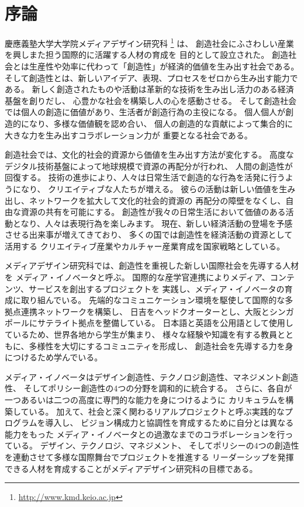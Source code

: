 
\chapter{序論}
\label{intro}

\makeendnotes

慶應義塾大学大学院メディアデザイン研究科%
\footnote{\url{http://www.kmd.keio.ac.jp}} は、
創造社会にふさわしい産業を興しまた担う国際的に活躍する人材の育成を%
目的として設立された。
創造社会とは生産性や効率に代わって「創造性」が経済的価値を生み出す社会である。
そして創造性とは、新しいアイデア、表現、プロセスをゼロから生み出す能力である。
新しく創造されたものや活動は革新的な技術を生み出し活力のある経済基盤を創りだし、
心豊かな社会を構築し人の心を感動させる。
そして創造社会では個人の創造に価値があり、生活者が創造行為の主役になる。
個人個人が創造的になり、多様な価値観を認め合い、
個人の創造的な貢献によって集合的に大きな力を生み出すコラボレーション力が%
重要となる社会である。

創造社会では、文化的社会的資源から価値を生み出す方法が変化する。
高度なデジタル技術基盤によって地球規模で資源の再配分が行われ、
人間の創造性が回復する。
技術の進歩により、人々は日常生活で創造的な行為を活発に行うようになり、
クリエイティブな人たちが増える。
彼らの活動は新しい価値を生み出し、ネットワークを拡大して文化的社会的資源の%
再配分の障壁をなくし、自由な資源の共有を可能にする。
創造性が我々の日常生活において価値のある活動となり、人々は表現行為を楽しみます。
現在、新しい経済活動の登場を予感させる出来事が増えてきており、
多くの国では創造性を経済活動の資源として活用する%
クリエイティブ産業やカルチャー産業育成を国家戦略としている。

メディアデザイン研究科では、創造性を重視した新しい国際社会を先導する人材を%
メディア・イノベータと呼ぶ。
国際的な産学官連携によりメディア、コンテンツ、サービスを創出するプロジェクトを%
実践し、メディア・イノベータの育成に取り組んでいる。
先端的なコミュニケーション環境を駆使して国際的な多拠点連携ネットワークを構築し、
日吉をヘッドクオーターとし、大阪とシンガポールにサテライト拠点を整備している。
日本語と英語を公用語として使用しているため、世界各地から学生が集まり、
様々な経験や知識を有する教員とともに、多様性を大切にするコミュニティを形成し、
創造社会を先導する力を身につけるため学んでいる。

メディア・イノベータはデザイン創造性、テクノロジ創造性、マネジメント創造性、
そしてポリシー創造性の4つの分野を調和的に統合する。
さらに、各自が一つあるいは二つの高度に専門的な能力を身につけるように%
カリキュラムを構築している。
加えて、社会と深く関わるリアルプロジェクトと呼ぶ実践的なプログラムを導入し、
ビジョン構成力と協調性を育成するために自分とは異なる能力をもった%
メディア・イノベータとの過激なまでのコラボレーションを行っている。
デザイン、テクノロジ、マネジメント、
そしてポリシーの4つの創造性を連動させて多様な国際舞台でプロジェクトを推進する%
リーダーシップを発揮できる人材を育成することがメディアデザイン研究科の目標である。

